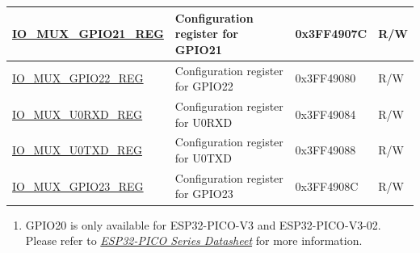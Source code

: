 \begin{longtable}{ | p{5cm} | p{7.5cm} | p{2cm} | p{1cm} | }
\hyperref[regdesc:IOMUXnREG]{IO\_MUX\_GPIO21\_REG} & Configuration register for GPIO21 & 0x3FF4907C & R/W \\ \hline
\hyperref[regdesc:IOMUXnREG]{IO\_MUX\_GPIO22\_REG} & Configuration register for GPIO22 & 0x3FF49080 & R/W \\ \hline
\hyperref[regdesc:IOMUXnREG]{IO\_MUX\_U0RXD\_REG} & Configuration register for U0RXD & 0x3FF49084 & R/W \\ \hline
\hyperref[regdesc:IOMUXnREG]{IO\_MUX\_U0TXD\_REG} & Configuration register for U0TXD & 0x3FF49088 & R/W \\ \hline
\hyperref[regdesc:IOMUXnREG]{IO\_MUX\_GPIO23\_REG} & Configuration register for GPIO23 & 0x3FF4908C & R/W \\ \hline
\end{longtable}

\vspace {-1em}
\begin{small}
\begin{enumerate}
  \item GPIO20 is only available for ESP32-PICO-V3 and ESP32-PICO-V3-02. Please refer to \href{https://www.espressif.com/sites/default/files/documentation/esp32-pico_series_datasheet_en.pdf}{\textit{ESP32-PICO Series Datasheet}} for more information.\\
\end{enumerate}
\end{small}
